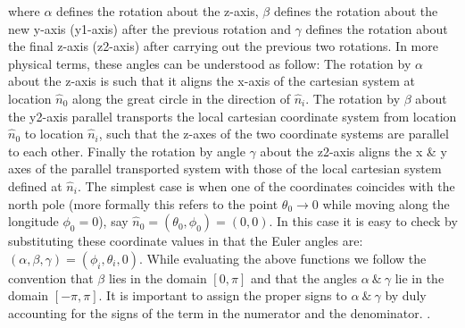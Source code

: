 where $\alpha$ defines the rotation about the z-axis, $\beta$ defines the rotation about the new y-axis (y1-axis) after the previous rotation and $\gamma$ defines the rotation about the final z-axis (z2-axis) after carrying out the previous two rotations. In more physical terms, these angles can be understood as follow: The rotation by $\alpha$ about the z-axis is such that it aligns the x-axis of the cartesian system at location $\hat{n}_0$ along the great circle in the direction of $\hat{n}_i$.  The rotation by $\beta$ about the y2-axis parallel transports the local cartesian coordinate system from location $\hat{n}_0$ to location $\hat{n}_i$, such that the z-axes of the two coordinate systems are parallel to each other. Finally the rotation by angle $\gamma$ about the z2-axis aligns the x \& y axes of the parallel transported system with those of the local cartesian system defined at $\hat{n}_i$. The simplest case is when one of the coordinates coincides with the north pole (more formally this refers to the point $\theta_0 \rightarrow 0$ while moving along the longitude $\phi_0=0$), say $\hat{n}_0=(\theta_0,\phi_0)=(0,0)$. In this case it is easy to check by substituting these coordinate values in   that the Euler angles are: $(\alpha,\beta,\gamma) =(\phi_i,\theta_i,0)$. While evaluating the above functions we follow the convention that $\beta$ lies in the domain $[0, \pi]$ and that the angles $\alpha ~\&~ \gamma$ lie in the domain $[-\pi,\pi]$. It is important to assign the proper signs to $\alpha ~\&~ \gamma$ by duly accounting for the signs of the term in the numerator and the denominator. .

